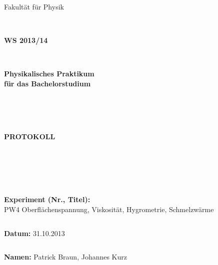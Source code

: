 \documentclass[12pt,a4paper]{article}
\begin{document}
\thispagestyle{empty}
			\begin{center}
			\Large{Fakultät für Physik}\\
			\end{center}
\begin{verbatim}


\end{verbatim}
			\begin{center}
			\textbf{\LARGE WS 2013/14}
			\end{center}
\begin{verbatim}


\end{verbatim}
			\begin{center}
			\textbf{\LARGE{Physikalisches Praktikum\\ für das Bachelorstudium}}
			\end{center}
\begin{verbatim}




\end{verbatim}

			\begin{center}
			\textbf{\LARGE{PROTOKOLL}}
			\end{center}
			
\begin{verbatim}





\end{verbatim}

			\begin{flushleft}
			\textbf{\Large{Experiment (Nr., Titel):}}\\
			\LARGE{PW4 Oberflächenspannung, Viskosität, Hygrometrie, Schmelzwärme}	
			\end{flushleft}

\begin{verbatim}

\end{verbatim}	
			\begin{flushleft}
			\textbf{\Large{Datum:}} \Large{31.10.2013}
			\end{flushleft}
			
\begin{verbatim}
\end{verbatim}
		\begin{flushleft}
			\textbf{\Large{Namen:}} \Large{Patrick Braun, Johannes Kurz}
			\end{flushleft}
\end{document}
